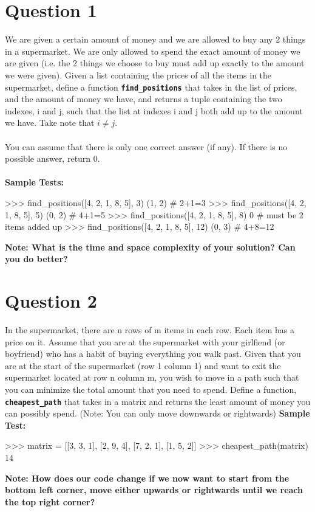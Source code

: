 \section{Question 1}
We are given a certain amount of money and we are allowed to buy any 2 things in a
supermarket. We are only allowed to spend the exact amount of money we are given
(i.e. the 2 things we choose to buy must add up exactly to the amount we were given).
Given a list containing the prices of all the items in the supermarket, define a function
\texttt{\bfseries find\_positions} that takes in the list of prices, and the amount of money we have,
and returns a tuple containing the two indexes, i and j, such that the list at indexes i and
j both add up to the amount we have. Take note that $i \neq j$. \\ \\
You can assume that there is only one correct answer (if any). If there is no possible
answer, return 0. \\ \\
\textbf{Sample Tests:}
\begin{python}
>>> find_positions([4, 2, 1, 8, 5], 3)
(1, 2)  # 2+1=3
>>> find_positions([4, 2, 1, 8, 5], 5)
(0, 2)  # 4+1=5
>>> find_positions([4, 2, 1, 8, 5], 8)
0       # must be 2 items added up
>>> find_positions([4, 2, 1, 8, 5], 12)
(0, 3)  # 4+8=12
\end{python}
\textbf{Note: What is the time and space complexity of your solution? Can you do better?}

\section{Question 2}
In the supermarket, there are n rows of m items in each row. Each item has a price
on it. Assume that you are at the supermarket with your girlfiend (or boyfriend) who has a habit of
buying everything you walk past. Given that you are at the start of the supermarket (row
1 column 1) and want to exit the supermarket located at row n column m, you wish to move in a
path such that you can minimize the total amount that you need to spend. Define a
function, \texttt{\bfseries cheapest\_path} that takes in a matrix and returns the least amount of
money you can possibly spend. (Note: You can only move downwards or rightwards)
\newpage
\textbf{Sample Test:}
\begin{python}
>>> matrix = [[3, 3, 1],
              [2, 9, 4],
              [7, 2, 1],
              [1, 5, 2]]
>>> cheapest_path(matrix)
14
\end{python}
\textbf{Note: How does our code change if we now want to start from the bottom left
corner, move either upwards or rightwards until we reach the top right corner?}

